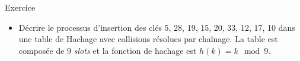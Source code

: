 \documentclass[handout]{beamer}
\begin{document}
\begin{frame}[t]{Exercice}
    \begin{itemize}
        \item Décrire le processus d'insertion des clés 5, 28, 19, 15, 20, 33, 12, 17, 10 dans une table de Hachage avec collisions résolues par chaînage. La table est composée de 9 \textit{slots} et la fonction de hachage est $h(k)=k \mod 9$.
    \end{itemize}
\end{frame}

\end{document}
